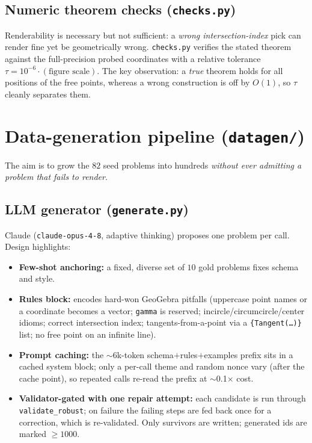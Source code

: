 \documentclass[11pt]{article}
\newcommand{\code}[1]{\texttt{\small #1}}
\begin{document}
\subsection{Numeric theorem checks (\texttt{checks.py})}
Renderability is necessary but not sufficient: a \emph{wrong intersection-index}
pick can render fine yet be geometrically wrong. \code{checks.py} verifies the
stated theorem against the full-precision probed coordinates with a relative
tolerance $\tau = 10^{-6}\cdot(\text{figure scale})$. The key observation: a
\emph{true} theorem holds for all positions of the free points, whereas a wrong
construction is off by $O(1)$, so $\tau$ cleanly separates them.

\section{Data-generation pipeline (\texttt{datagen/})}

The aim is to grow the $82$ seed problems into hundreds \emph{without ever
admitting a problem that fails to render}.

\subsection{LLM generator (\texttt{generate.py})}
Claude (\code{claude-opus-4-8}, adaptive thinking) proposes one problem per call.
Design highlights:
\begin{itemize}[nosep]
  \item \textbf{Few-shot anchoring:} a fixed, diverse set of $10$ gold problems
        fixes schema and style.
  \item \textbf{Rules block:} encodes hard-won GeoGebra pitfalls (uppercase
        point names or a coordinate becomes a vector; \code{gamma} is reserved;
        incircle/circumcircle/center idioms; correct intersection index;
        tangents-from-a-point via a \code{\{Tangent(\dots)\}} list; no free point
        on an infinite line).
  \item \textbf{Prompt caching:} the $\sim$6k-token schema$+$rules$+$examples
        prefix sits in a cached system block; only a per-call theme and random
        nonce vary (after the cache point), so repeated calls re-read the prefix
        at $\sim$0.1$\times$ cost.
  \item \textbf{Validator-gated with one repair attempt:} each candidate is run
        through \code{validate\_robust}; on failure the failing steps are fed
        back once for a correction, which is re-validated. Only survivors are
        written; generated ids are marked $\ge 1000$.
\end{itemize}
\end{document}
